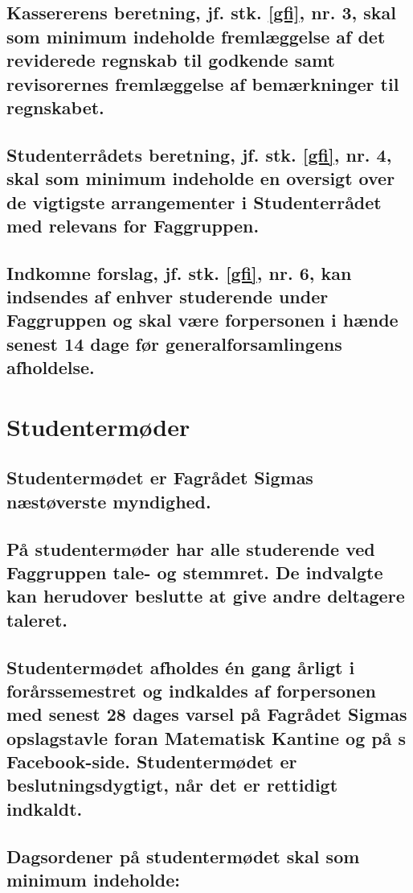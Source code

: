 \documentclass[10pt]{article}
\newcommand{\fagr}{\text{Fagrådet Sigma}}
\begin{document}
\subsection{Kassererens beretning, jf. stk. \ref{gfi}, nr. 3, skal som minimum indeholde fremlæggelse af det reviderede regnskab til godkende samt revisorernes fremlæggelse af bemærkninger til regnskabet.}

\subsection{Studenterrådets beretning, jf. stk. \ref{gfi}, nr. 4, skal som minimum indeholde en oversigt over de vigtigste arrangementer i Studenterrådet med relevans for Faggruppen.}

\subsection{Indkomne forslag, jf. stk. \ref{gfi}, nr. 6, kan indsendes af enhver studerende under Faggruppen og skal være forpersonen i hænde senest 14 dage før generalforsamlingens afholdelse.}

\section{Studentermøder}

\subsection{Studentermødet er Fagrådet Sigmas næstøverste myndighed.}

\subsection{På studentermøder har alle studerende ved Faggruppen tale- og stemmret. De indvalgte kan herudover beslutte at give andre deltagere taleret.}

\subsection{Studentermødet afholdes én gang årligt i forårssemestret og indkaldes af forpersonen med senest 28 dages varsel på Fagrådet Sigmas opslagstavle foran Matematisk Kantine og på \fagr{}s Facebook-side. Studentermødet er beslutningsdygtigt, når det er rettidigt indkaldt.}

\subsection{Dagsordener på studentermødet skal som minimum indeholde:}
\end{document}
